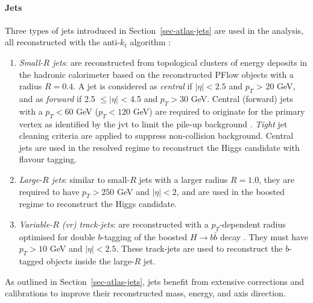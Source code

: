 \paragraph{Jets} Three types of jets introduced in Section~\ref{sec-atlas-jets} are used in the analysis, all reconstructed with the anti-$k_t$ algorithm \cite{Cacciari:2008gp}:
\begin{enumerate}
  \item \textit{Small-$R$ jets}: are reconstructed from topological clusters of energy deposits in the hadronic calorimeter based on the reconstructed PFlow objects with a radius $R = 0.4$. A jet is considered as \textit{central} if $|\eta| < 2.5$ and $p_T$ > 20 GeV, and as \textit{forward} if 2.5 $\leq |\eta|$ < 4.5 and $p_T > 30$ GeV. Central (forward) jets with a $p_T < 60$ GeV ($p_T < 120$ GeV) are required to originate for the primary vertex as identified by the \gls{jvt} to limit the pile-up background \cite{atlasPUJVT}. \textit{Tight} jet cleaning criteria are applied to suppress non-collision background. Central jets are used in the resolved regime to reconstruct the Higgs candidate with flavour tagging. 
  \item \textit{Large-$R$ jets}: similar to small-$R$ jets with a larger radius $R = 1.0$, they are required to have $p_T > 250$ GeV and $|\eta| < 2$, and are used in the boosted regime to reconstruct the Higgs candidate. 
  \item \textit{Variable-$R$ (\gls{vr}) track-jets}: are reconstructed with a $p_T$-dependent radius optimised for double $b$-tagging of the boosted $H \rightarrow b\bar{b}$ decay \cite{ATL-PHYS-PUB-2017-010}. They must have $p_T > 10$ GeV and $|\eta| < 2.5$. These track-jets are used to reconstruct the $b$-tagged objects inside the large-$R$ jet. 
\end{enumerate}
As outlined in Section~\ref{sec-atlas-jets}, jets benefit from extensive corrections and calibrations to improve their reconstructed mass, energy, and axis direction.

